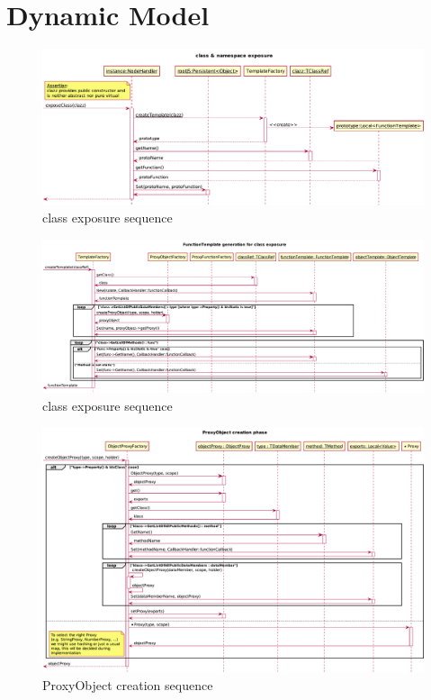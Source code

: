 \section{Dynamic Model}

\begin{figure}[H]
	\centering
	\includegraphics[width=18cm]{./latex/resources/classExposureSequence.pdf}
	\caption{class exposure sequence}
\end{figure}

\begin{figure}[H]
	\centering
	\includegraphics[width=18cm]{./latex/resources/functionTemplateGenerate.pdf}
	\caption{class exposure sequence}
\end{figure}

\begin{figure}[H]
	\centering
	\includegraphics[width=18cm]{./latex/resources/createProxyObject.pdf}
	\caption{ProxyObject creation sequence}
\end{figure}

\newpage
